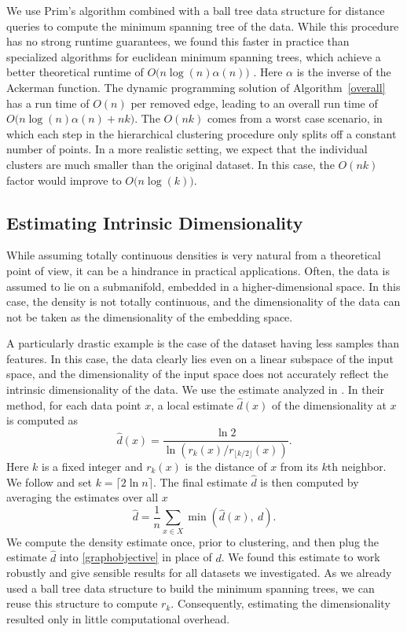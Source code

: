We use Prim's algorithm combined with a ball tree data structure for distance
queries to compute the minimum spanning tree of the data.
While this procedure has no strong runtime guarantees, we found this faster
in practice than specialized algorithms for euclidean minimum spanning trees, 
which achieve a better theoretical runtime of $O\bigl(n \log(n) \alpha(n)\bigr)$ \citep{dtb2010}. Here
$\alpha$ is the inverse of the Ackerman function. The dynamic programming solution of
Algorithm~\ref{overall} has a run time of $O(n)$ per removed edge, leading to an overall
run time of $O\bigl(n \log(n) \alpha(n)+ nk\bigr)$. The $O(nk)$ comes from a worst case
scenario, in which each step in the hierarchical clustering procedure only
splits off a constant number of points. In a more realistic setting, we expect
that the individual clusters are much smaller than the original dataset. In
this case, the $O(nk)$ factor would improve to $O\bigl(n\log(k)\bigr)$.

\subsection{Estimating Intrinsic Dimensionality}
While assuming totally continuous densities is very natural from a theoretical
point of view, it can be a hindrance in practical applications.  Often, the
data is assumed to lie on a submanifold, embedded in a
higher-dimensional space. In this case, the density is not totally continuous,
and the dimensionality of the data can not be taken as the dimensionality of
the embedding space.

A particularly drastic example is the case of the dataset having less samples
than features. In this case, the data clearly lies even on a linear subspace
of the input space, and the dimensionality of the input space does not
accurately reflect the intrinsic dimensionality of the data.
We use the estimate analyzed in \citet{massoud2007manifold}.
In their method, for each data point $x$, a local estimate $\hat{d}(x)$ of the
dimensionality at $x$ is computed as
\begin{equation}
    \hat{d}(x) = \frac{\ln 2}{\ln\left(r_k(x) / r_{\lfloor k /2 \rfloor}(x)\right)}.
\end{equation}
Here $k$ is a fixed integer and $r_k(x)$ is the distance of $x$ from its $k$th neighbor.
We follow \citet{massoud2007manifold} and set $k =\lceil 2 \ln n\rceil$.
The final estimate $\hat{d}$ is then computed by averaging the estimates over all $x$
\begin{equation}
    \hat{d} = \frac{1}{n}\sum_{x \in X} \min\left(\hat{d}(x),\ d\right).
\end{equation}
We compute the density estimate once, prior to clustering, and then plug the
estimate $\hat{d}$ into \eqref{graphobjective} in place of $d$.
We found this estimate to work robustly and give sensible results for all
datasets we investigated. As we already used a ball tree data structure to
build the minimum spanning trees, we can reuse this structure to compute $r_k$.
Consequently, estimating the dimensionality resulted only in little
computational overhead.

